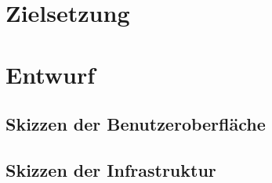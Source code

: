 \section{Zielsetzung}
\label{sec:zielsetzung}

\section{Entwurf}
\label{sec:entwurf}

\subsection{Skizzen der Benutzeroberfläche}
\label{subsec:skizzenderbenutzeroberflaeche}
\subsection{Skizzen der Infrastruktur}
\label{subsec:skizzenderinfrastruktur}


